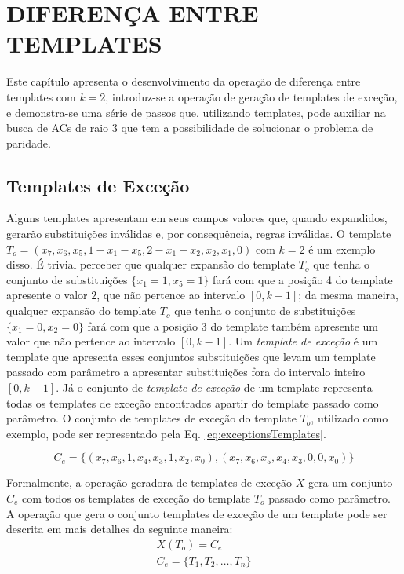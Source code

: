 \section{DIFERENÇA ENTRE TEMPLATES}
\label{sec:resultadosParciais}
Este capítulo apresenta o desenvolvimento da operação de diferença entre templates com $k=2$, introduz-se a operação de geração de templates de exceção, e demonstra-se uma série de passos que, utilizando templates, pode auxiliar na busca de ACs de raio 3 que tem a possibilidade de solucionar o problema de paridade.

\subsection{Templates de Exceção}
Alguns templates apresentam em seus campos valores que, quando expandidos, gerarão substituições inválidas e, por consequência, regras inválidas. O template $T_o = (x_7, x_6, x_5, 1 - x_1 - x_5, 2 - x_1 - x_2, x_2, x_1, 0)$ com $k=2$ é um exemplo disso. É trivial perceber que qualquer expansão do template $T_o$ que tenha o conjunto de substituições $\{x_1 = 1, x_5 = 1\}$ fará com que a posição 4 do template apresente o valor $2$, que não pertence ao intervalo $[0,k-1]$; da mesma maneira, qualquer expansão do template $T_o$ que tenha o conjunto de substituições $\{x_1 = 0, x_2 = 0\}$ fará com que a posição 3 do template também apresente um valor que não pertence ao intervalo $[0,k-1]$. Um \textit{template de exceção} é um template que apresenta esses conjuntos substituições que levam um template passado com parâmetro a apresentar substituições fora do intervalo inteiro $[0, k-1]$. Já o conjunto de \textit{template de exceção} de um template representa todas os templates de exceção encontrados apartir do template passado como parâmetro. O conjunto de templates de exceção do template $T_o$, utilizado como exemplo, pode ser representado pela Eq. \ref{eq:exceptionsTemplates}.

\begin{equation}
C_e = \{(x_7, x_6, 1, x_4, x_3, 1, x_2, x_0),(x_7, x_6, x_5, x_4, x_3, 0, 0, x_0)\}
\label{eq:exceptionsTemplates}
\end{equation}

Formalmente, a operação geradora de templates de exceção $X$ gera um conjunto $C_e$ com todos os templates de exceção do template $T_o$ passado como parâmetro. A operação que gera o conjunto templates de exceção de um template pode ser descrita em mais detalhes da seguinte maneira:
\begin{equation}
\begin{split}
X(T_o)= C_e \\
C_e = \{T_1,T_2,\dots, T_n\}\\
\end{split}
\end{equation}

